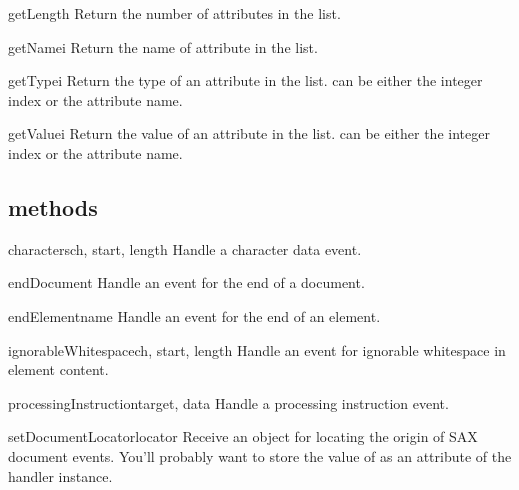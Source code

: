 \documentclass{howto}
\begin{document}
\begin{methoddesc}{getLength}{}
Return the number of attributes in the list.
\end{methoddesc}

\begin{methoddesc}{getName}{i}
Return the name of attribute  in the list.
\end{methoddesc}

\begin{methoddesc}{getType}{i}
Return the type of an attribute in the list.  can be
either the integer index or the attribute name.
\end{methoddesc}

\begin{methoddesc}{getValue}{i}
Return the value of an attribute in the list.  can be
either the integer index or the attribute name.
\end{methoddesc}

\subsection{ methods}

\begin{methoddesc}{characters}{ch, start, length}
Handle a character data event.
\end{methoddesc}

\begin{methoddesc}{endDocument}{}
Handle an event for the end of a document.
\end{methoddesc}

\begin{methoddesc}{endElement}{name}
Handle an event for the end of an element.
\end{methoddesc}

\begin{methoddesc}{ignorableWhitespace}{ch, start, length}
Handle an event for ignorable whitespace in element content.
\end{methoddesc}

\begin{methoddesc}{processingInstruction}{target, data}
Handle a processing instruction event.
\end{methoddesc}

\begin{methoddesc}{setDocumentLocator}{locator}
Receive an object for locating the origin of SAX document events.
You'll probably want to store the value of  as an
attribute of the handler instance.
\end{methoddesc}
\end{document}
